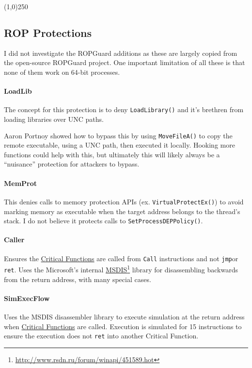 \documentclass[]{article}
\newcommand{\fhref}[2]{\href{#1}{#2}\footnote{\url{#1}}}
\newcommand{\sectionbreakline}[0]{\begin{center}\line(1,0){250}\end{center}}
\begin{document}
\sectionbreakline{}



\subsection{ROP Protections}
I did not investigate the ROPGuard additions as these are largely copied from the open-source ROPGuard project\cite{ropguard_source}.  One important limitation of all these is that none of them work on 64-bit processes.

\paragraph{LoadLib}\label{loadlib}
The concept for this protection is to deny \texttt{LoadLibrary()} and it's brethren from loading libraries over UNC paths.

Aaron Portnoy showed\cite{bypass_all_the_things} how to bypass this by using \texttt{MoveFileA()} to copy the remote executable, using a UNC path, then executed it locally.  Hooking more functions could help with this, but ultimately this will likely always be a ``nuisance'' protection for attackers to bypass.


\paragraph{MemProt}\label{memprot}
This denies calls to memory protection APIs (ex. \texttt{VirtualProtectEx()}) to avoid marking memory as executable when the target address belongs to the thread's stack.  I do not believe it protects calls to \texttt{SetProcessDEPPolicy()}. 


\paragraph{Caller}\label{caller}
Ensures the \hyperref[critical_functions]{Critical Functions} are called from \texttt{Call} instructions and not \texttt{jmp}or \texttt{ret}.  Uses the Microsoft's internal \fhref{http://www.rsdn.ru/forum/winapi/451589.hot}{MSDIS}\cite{msdis} library for disassembling backwards from the return address, with many special cases\cite{inside_emet}.

\paragraph{SimExecFlow}\label{simexecflow}
Uses the MSDIS disassembler library to execute simulation at the return address when \hyperref[critical_functions]{Critical Functions} are called.  Execution is simulated for 15 instructions to ensure the execution does not \texttt{ret} into another Critical Function\cite{inside_emet}.
\end{document}
